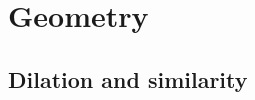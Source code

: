 \chapter{Geometry}\label{geometry}

\section{Dilation and similarity}\label{sec:similarity}

\wbnewpage
